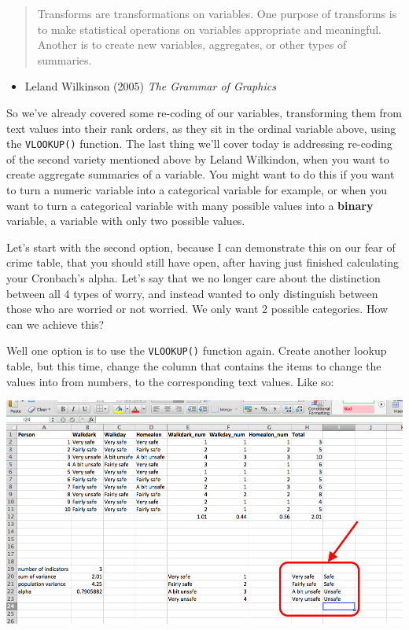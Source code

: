\documentclass[]{book}
\providecommand{\tightlist}{%
  \setlength{\itemsep}{0pt}\setlength{\parskip}{0pt}}
\theoremstyle{definition}
\theoremstyle{definition}
\theoremstyle{definition}
\theoremstyle{remark}
\begin{document}
\begin{quote}
Transforms are transformations on variables. One purpose of transforms
is to make statistical operations on variables appropriate and
meaningful. Another is to create new variables, aggregates, or other
types of summaries.
\end{quote}

\begin{itemize}
\tightlist
\item
  Leland Wilkinson (2005) \emph{The Grammar of Graphics}
\end{itemize}

So we've already covered some re-coding of our variables, transforming
them from text values into their rank orders, as they sit in the ordinal
variable above, using the \texttt{VLOOKUP()} function. The last thing
we'll cover today is addressing re-coding of the second variety
mentioned above by Leland Wilkindon, when you want to create aggregate
summaries of a variable. You might want to do this if you want to turn a
numeric variable into a categorical variable for example, or when you
want to turn a categorical variable with many possible values into a
\textbf{binary} variable, a variable with only two possible values.

Let's start with the second option, because I can demonstrate this on
our fear of crime table, that you should still have open, after having
just finished calculating your Cronbach's alpha. Let's say that we no
longer care about the distinction between all 4 types of worry, and
instead wanted to only distinguish between those who are worried or not
worried. We only want 2 possible categories. How can we achieve this?

Well one option is to use the \texttt{VLOOKUP()} function again. Create
another lookup table, but this time, change the column that contains the
items to change the values into from numbers, to the corresponding text
values. Like so:

\includegraphics{imgs/new_lookup_tab.png}
\end{document}
